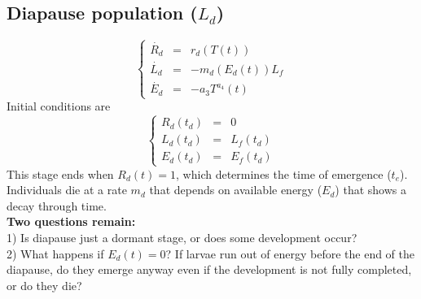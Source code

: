 \documentclass[12 pt]{article}
\begin{document}
\subsection{Diapause population ($L_d$)}
\begin{equation}
    \left \lbrace
    \begin{array}{lcl}
        \Dot{R_d} & = & r_d(T(t)) \\
        \Dot{L_d} & = & - m_d(E_d (t))L_f \\
        \Dot{E_d} & = & -a_3 T ^{a_4} (t)
    \end{array} \right .
\end{equation}
Initial conditions are
\begin{equation}
    \left \lbrace
    \begin{array}{lcl}
	R_d(t_d) & = & 0 \\
	L_d(t_d) & = & L_f(t_d) \\
	E_d(t_d) & = & E_f(t_d)	
    \end{array} \right .
\end{equation}
This stage ends when $R_d(t)=1$, which determines the time of emergence ($t_e$). Individuals die at a rate $m_d$ that depends on available energy ($E_d$) that shows a decay through time. \\
\textbf{Two questions remain:} \\
1) Is diapause just a dormant stage, or does some development occur? \\
2) What happens if $E_d (t)= 0$? If larvae run out of energy before the end of the diapause, do they emerge anyway even if the development is not fully completed, or do they die?
\end{document}
